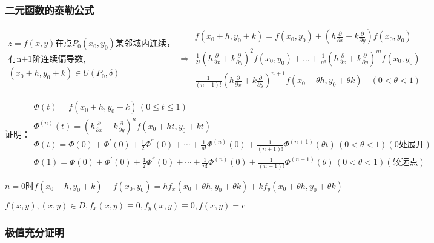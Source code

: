 \documentclass[UTF8]{ctexart}
\newcommand{\mt}[1]{\text{#1}}
\newcommand{\mf}[1]{\left( #1\right)}
\newcommand{\q}{\quad}
\newcommand{\qa}{\vspace{12 pt}}
\newcommand{\p}{\par}
\newcommand{\ma}[1]{\begin{array}{llll} #1 \end{array}}
\newcommand{\da}[2]{\frac{\partial #1}{\partial #2}}
\begin{document}
\subsubsection{二元函数的泰勒公式}
$\ma{z=f\mf{x,y}\mt{在点}P_0\mf{x_0,y_0}\mt{某邻域内连续，}\\
\mt{有n+1阶连续偏导数,}\\
\mf{x_0+h,y_0+k} \in U\mf{P_0,\delta}}\Rightarrow \ma{f\mf{x_0+h,y_0+k}=f\mf{x_0,y_0}+\mf{h\da{}{x}+k\da{}{y}}f\mf{x_0,y_0}\\
    \frac{1}{2!}\mf{h\da{}{x}+k\da{}{y}}^2f\mf{x_0,y_0}+\dots+\frac{1}{n!}\mf{h\da{}{x}+k\da{}{y}}^mf\mf{x_0,y_0}\\
    \frac{1}{\mf{n+1}!}\mf{h\da{}{x}+k\da{}{y}}^{n+1}f\mf{x_0+\theta h,y_0+\theta k} \q \mf{0<\theta<1}
}$


$\mt{证明：}\ma{\Phi\mf{t}=f\mf{x_0+h,y_0+k} \, \mf{0\leqslant t \leqslant 1}\\
\Phi^{\mf{n}}\mf{t}=\mf{h\da{}{x}+k\da{}{y}}^nf\mf{x_0+ht,y_0+kt}\\
\Phi\mf{t}=\Phi\mf{0}+\Phi^{'}\mf{0}+\frac{1}{2}\Phi^{''}\mf{0}+\cdots+\frac{1}{n!}\Phi^{\mf{n}}\mf{0}+\frac{1}{\mf{n+1}!}\Phi^{\mf{n+1}}\mf{\theta t} \,\mf{0<\theta<1}\mf{0处展开}\\
\Phi\mf{1}=\Phi\mf{0}+\Phi^{'}\mf{0}+\frac{1}{2}\Phi^{''}\mf{0}+\cdots+\frac{1}{n!}\Phi^{\mf{n}}\mf{0}+\frac{1}{\mf{n+1}!}\Phi^{\mf{n+1}}\mf{\theta } \,\mf{0<\theta<1}\mf{较远点}
}$
\qa

$n=0\mt{时}f\mf{x_0+h,y_0+k}-f\mf{x_0,y_0}=hf_x\mf{x_0+\theta h,y_0+\theta k}+kf_y\mf{x_0+\theta h,y_0+\theta k}$
\qa 

$f\mf{x,y},\mf{x,y}\in D,f_x\mf{x,y} \equiv 0,f_y\mf{x,y} \equiv 0,f\mf{x,y}= c$\p



\subsubsection{极值充分证明}
\end{document}
